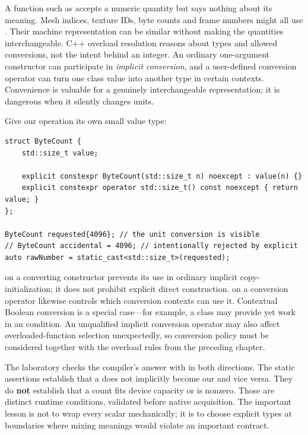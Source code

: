 \hypertarget{01-foundations-i-ch004-the-first-bug-is-possible-before-we-load-a-file-4096-of-what}{}

A function such as  accepts a numeric quantity but says nothing about its meaning. Mesh indices, texture IDs, byte counts and frame numbers might all use . Their machine representation can be similar without making the quantities interchangeable. C++ overload resolution reasons about types and allowed conversions, not the intent behind an integer. An ordinary one-argument constructor can participate in \emph{implicit conversion}, and a user-defined conversion operator can turn one class value into another type in certain contexts. Convenience is valuable for a genuinely interchangeable representation; it is dangerous when it silently changes units.

Give our operation its own small value type:

\begin{verbatim}
struct ByteCount {
    std::size_t value;

    explicit constexpr ByteCount(std::size_t n) noexcept : value(n) {}
    explicit constexpr operator std::size_t() const noexcept { return value; }
};

ByteCount requested{4096}; // the unit conversion is visible
// ByteCount accidental = 4096; // intentionally rejected by explicit
auto rawNumber = static_cast<std::size_t>(requested);
\end{verbatim}

 on a converting constructor prevents its use in ordinary implicit copy-initialization; it does not prohibit explicit direct construction.  on a conversion operator likewise controls which conversion contexts can use it. Contextual Boolean conversion is a special case---for example, a class may provide  yet work in an  condition. An unqualified implicit conversion operator may also affect overloaded-function selection unexpectedly, so conversion policy must be considered together with the overload rules from the preceding chapter.

The laboratory checks the compiler's answer with  in both directions. The static assertions establish that a  does not implicitly become our  and vice versa. They do \textbf{not} establish that a count fits device capacity or is nonzero. Those are distinct runtime conditions, validated before native acquisition. The important lesson is not to wrap every scalar mechanically; it is to choose explicit types at boundaries where mixing meanings would violate an important contract.

